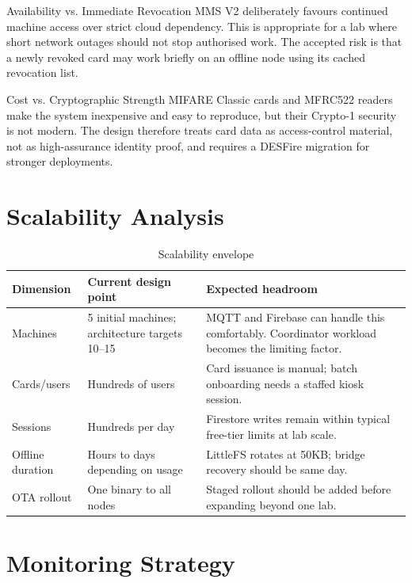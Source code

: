 \begin{riskbox}{Availability vs. Immediate Revocation}
MMS V2 deliberately favours continued machine access over strict cloud dependency. This is appropriate for a lab where short network outages should not stop authorised work. The accepted risk is that a newly revoked card may work briefly on an offline node using its cached revocation list.
\end{riskbox}

\begin{riskbox}{Cost vs. Cryptographic Strength}
MIFARE Classic cards and MFRC522 readers make the system inexpensive and easy to reproduce, but their Crypto-1 security is not modern. The design therefore treats card data as access-control material, not as high-assurance identity proof, and requires a DESFire migration for stronger deployments.
\end{riskbox}

\section{Scalability Analysis}

\begin{table}[H]
\centering
\caption{Scalability envelope}
\begin{tabular}{L{4cm}L{5cm}L{5cm}}
\toprule
\textbf{Dimension} & \textbf{Current design point} & \textbf{Expected headroom} \\
\midrule
Machines & 5 initial machines; architecture targets 10--15 & MQTT and Firebase can handle this comfortably. Coordinator workload becomes the limiting factor. \\
Cards/users & Hundreds of users & Card issuance is manual; batch onboarding needs a staffed kiosk session. \\
Sessions & Hundreds per day & Firestore writes remain within typical free-tier limits at lab scale. \\
Offline duration & Hours to days depending on usage & LittleFS rotates at 50KB; bridge recovery should be same day. \\
OTA rollout & One binary to all nodes & Staged rollout should be added before expanding beyond one lab. \\
\bottomrule
\end{tabular}
\end{table}

\section{Monitoring Strategy}

